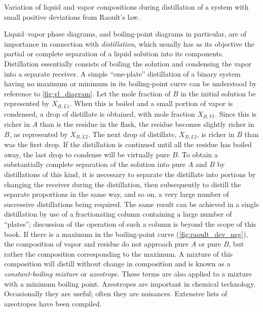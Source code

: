 \begin{marginfigure}
	
	\caption{Variation of liquid and vapor compositions during distillation of a system with small positive deviations from Raoult's law.}
	\label{fig:vl_diagram}
\end{marginfigure}
Liquid--vapor phase diagrams, and boiling-point diagrams in particular, are of importance in connection with \emph{distillation}, which usually has as its objective the partial or complete separation of a liquid solution into its components. 
Distillation essentially consists of boiling the solution and condensing the vapor into a separate receiver. 
A simple ``one-plate'' distillation of a binary system having no maximum or minimum in its boiling-point curve can be understood by reference to \cref{fig:vl_diagram}. 
Let the mole fraction of \(B\) in the initial solution be represented by \(X_{B, L1}\). 
When this is boiled and a small portion of vapor is condensed, a drop of distillate is obtained, with mole fraction \(X_{B,V1}\). 
Since this is richer in \(A\) than is the residue in the flask, the residue becomes slightly richer in \(B\), as represented by \(X_{B,L2}\). 
The next drop of distillate, \(X_{B,L2}\), is richer in \(B\) than was the first drop. 
If the distillation is continued until all the residue has boiled away, the last drop to condense will be virtually pure \(B\). 
To obtain a substantially complete separation of the solution into pure \(A\) and \(B\) by distillations of this kind, it is necessary to separate the distillate into portions by changing the receiver during the distillation, then subsequently to distill the separate proportions in the same way, and so on, a very large number of successive distillations being required. 
The same result can be achieved in a single distillation by use of a fractionating column containing a large number of ``plates''; discussion of the operation of such a column is beyond the scope of this book. 
If there is a maximum in the boiling-point curve (\cref{fig:raoult_dev_neg}), the composition of vapor and residue do not approach pure \(A\) or pure \(B\), but rather the composition corresponding to the maximum. 
A mixture of this composition will distill without change in composition and is known as a \emph{constant-boiling mixture} or \emph{azeotrope}. 
These terms are also applied to a mixture with a minimum boiling point. 
Azeotropes are important in chemical technology. 
Occasionally they are useful; often they are nuisances.
Extensive lists of azeotropes have been compiled.\cite{horsley1973azeotropic}

